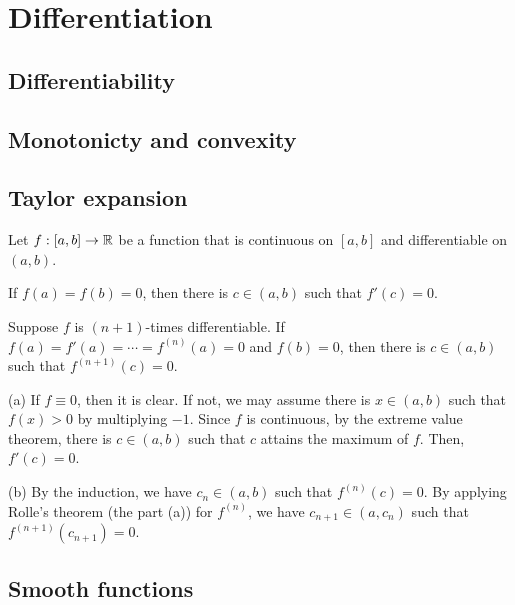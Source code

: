 \documentclass{../../large}
\begin{document}
\chapter{Differentiation}
\section{Differentiability}
\begin{prb}
\end{prb}

\section{Monotonicty and convexity}

\section{Taylor expansion}
\begin{prb}
Let $f:[a,b]\to\mathbb{R}$ be a function that is continuous on $[a,b]$ and differentiable on $(a,b)$.
\begin{parts}
\item If $f(a)=f(b)=0$, then there is $c\in(a,b)$ such that $f'(c)=0$.
\item Suppose $f$ is $(n+1)$-times differentiable. If $f(a)=f'(a)=\cdots=f^{(n)}(a)=0$ and $f(b)=0$, then there is $c\in(a,b)$ such that $f^{(n+1)}(c)=0$.
\end{parts}
\end{prb}
\begin{pf}
(a)
If $f\equiv0$, then it is clear.
If not, we may assume there is $x\in(a,b)$ such that $f(x)>0$ by multiplying $-1$.
Since $f$ is continuous, by the extreme value theorem, there is $c\in(a,b)$ such that $c$ attains the maximum of $f$.
Then, $f'(c)=0$.

(b)
By the induction, we have $c_n\in(a,b)$ such that $f^{(n)}(c)=0$.
By applying Rolle's theorem (the part (a)) for $f^{(n)}$, we have $c_{n+1}\in(a,c_n)$ such that $f^{(n+1)}(c_{n+1})=0$.
\end{pf}

\begin{prb}
\end{prb}


\section{Smooth functions}
\end{document}
